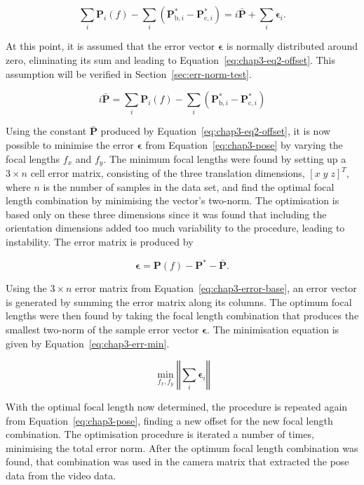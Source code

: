 \begin{equation}
  \label{eq:chap3-eq1-offset}
  \sum\limits_i \bm{P}_i(f) - \sum\limits_i(\bm{P}^*_{\mathrm{b},i} - \bm{P}^*_{\mathrm{c}, i}) = i\bar{\bm{P}} + \sum\limits_i\bm{\epsilon}_i.
\end{equation}

At this point, it is assumed that the error vector $\bm{\epsilon}$ is normally distributed around zero, eliminating its sum and leading to Equation~\ref{eq:chap3-eq2-offset}. This assumption will be verified in Section~\ref{sec:err-norm-test}. 

\begin{equation}
  \label{eq:chap3-eq2-offset}
  i\bar{\bm{P}} = \sum\limits_i \bm{P}_i(f) - \sum\limits_i(\bm{P}^*_{\mathrm{b},i} - \bm{P}^*_{\mathrm{c}, i})
\end{equation}

Using the constant $\bar{\bm{P}}$ produced by Equation~\ref{eq:chap3-eq2-offset}, it is now possible to minimise the error $\bm{\epsilon}$ from Equation~\ref{eq:chap3-pose} by varying the focal lengths $f_x$ and $f_y$. The minimum focal lengths were found by setting up a $3\times n$ cell error matrix, consisting of the three translation dimensions, ${[x\;y\;z]}^T$, where $n$ is the number of samples in the data set, and find the optimal focal length combination by minimising the vector's two-norm. The optimisation is based only on these three dimensions since it was found that including the orientation dimensions added too much variability to the procedure, leading to instability. The error matrix is produced by

\begin{equation}
  \label{eq:chap3-error-base}
  \bm{\epsilon} = \bm{P}(f) - \bm{P}^* - \bar{\bm{P}}.
\end{equation}

Using the $3\times n$ error matrix from Equation~\ref{eq:chap3-error-base}, an error vector is generated by summing the error matrix along its columns. The optimum focal lengths were then found by taking the focal length combination that produces the smallest two-norm of the sample error vector $\bm{\epsilon}$. The minimisation equation is given by Equation~\ref{eq:chap3-err-min}.

\begin{equation}
  \label{eq:chap3-err-min}
  \min_{f_x, f_y}\left \Vert \sum_i  \bm{\epsilon}_i \right \Vert
\end{equation}

With the optimal focal length now determined, the procedure is repeated again from Equation~\ref{eq:chap3-pose}, finding a new offset for the new focal length combination. The optimisation procedure is iterated a number of times, minimising the total error norm. After the optimum focal length combination was found, that combination was used in the camera matrix that extracted the pose data from the video data.

